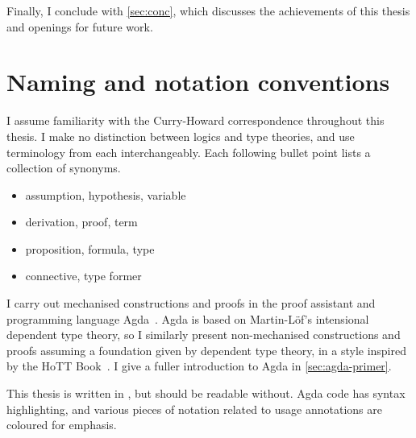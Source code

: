 Finally, I conclude with \cref{sec:conc}, which discusses the achievements of
this thesis and openings for future work.

\section{Naming and notation conventions}

I assume familiarity with the Curry-Howard correspondence throughout this
thesis.
I make no distinction between logics and type theories, and use terminology from
each interchangeably.
Each following bullet point lists a collection of synonyms.

\begin{itemize}
  \item assumption, hypothesis, variable
  \item derivation, proof, term
  \item proposition, formula, type
  \item connective, type former
\end{itemize}

I carry out mechanised constructions and proofs in the proof assistant and
programming language Agda~\citep{Agda}.
Agda is based on Martin-L\"{o}f's intensional dependent type theory, so I
similarly present non-mechanised constructions and proofs assuming a foundation
given by dependent type theory, in a style inspired by the HoTT
Book~\citep{hottbook}.
I give a fuller introduction to Agda in \cref{sec:agda-primer}.

This thesis is written in \colour{}, but should be readable without.
Agda code has syntax highlighting, and various pieces of notation related to
usage annotations are coloured  for emphasis.
